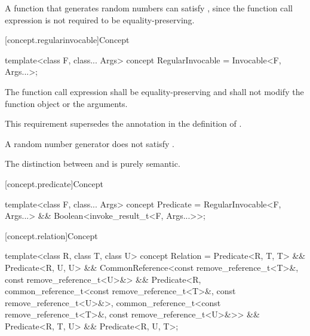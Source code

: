 \begin{itemdescr}
\pnum
\begin{example}
A function that generates random numbers can satisfy ,
since the  function call expression is not required to be
equality-preserving.
\end{example}
\end{itemdescr}

[concept.regularinvocable]{Concept }

%
\begin{itemdecl}
template<class F, class... Args>
  concept RegularInvocable = Invocable<F, Args...>;
\end{itemdecl}

\begin{itemdescr}
\pnum
The  function call expression shall be equality-preserving and
shall not modify the function object or the
arguments.
\begin{note}
This requirement supersedes the annotation in the definition of
.
\end{note}

\pnum
\begin{example}
A random number generator does not satisfy
.
\end{example}

\pnum
\begin{note}
The distinction between  and 
is purely semantic.
\end{note}
\end{itemdescr}

[concept.predicate]{Concept }

%
\begin{itemdecl}
template<class F, class... Args>
  concept Predicate = RegularInvocable<F, Args...> && Boolean<invoke_result_t<F, Args...>>;
\end{itemdecl}

[concept.relation]{Concept }

%
\begin{itemdecl}
template<class R, class T, class U>
  concept Relation =
    Predicate<R, T, T> && Predicate<R, U, U> &&
    CommonReference<const remove_reference_t<T>&, const remove_reference_t<U>&> &&
    Predicate<R,
      common_reference_t<const remove_reference_t<T>&, const remove_reference_t<U>&>,
      common_reference_t<const remove_reference_t<T>&, const remove_reference_t<U>&>> &&
    Predicate<R, T, U> && Predicate<R, U, T>;
\end{itemdecl}

